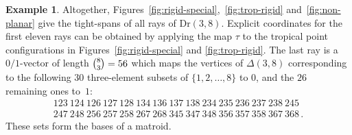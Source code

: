 \documentclass[11pt,a4paper]{amsart}
\newcommand{\Dr}[2]{{\mathrm{Dr}(#1,#2)}}
\theoremstyle{plain}
\theoremstyle{definition}
\newtheorem{example}[theorem]{Example}
\begin{document}
\begin{example}
  Altogether, Figures~\ref{fig:rigid-special},~\ref{fig:trop-rigid} and~\ref{fig:non-planar} give
  the tight-spans of all rays of $\Dr38$. Explicit coordinates for the first eleven rays can be
  obtained by applying the map $\tau$ to the tropical point configurations in
  Figures~\ref{fig:rigid-special} and \ref{fig:trop-rigid}.
  The last ray is a $0/1$-vector of length $\tbinom{8}{3}=56$ which maps the vertices of
  $\Delta(3,8)$ corresponding to the following $30$ three-element subsets of $\{1,2,\dots,8\}$ to $0$, and the
  $26$ remaining ones to~$1$:
  \begin{align*}
    123\ 124\ 126\ 127\ 128\ 134\ 136\ 137\ 138\ 234\ 235\ 236\ 237\ 238\ 245\ \\
    247\ 248\ 256\ 257\ 258\ 267\ 268\ 345\ 347\ 348\ 356\ 357\ 358\ 367\ 368 \, .
  \end{align*}
  These sets form the bases of a matroid.
\end{example}


\end{document}
